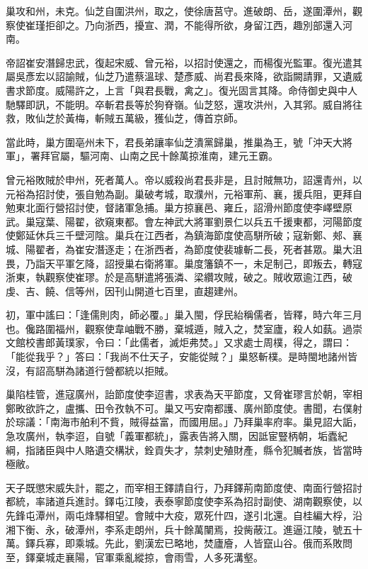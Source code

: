 \begin{pinyinscope}
 巢攻和州，未克。仙芝自圍洪州，取之，使徐唐莒守。進破朗、岳，遂圍潭州，觀察使崔瑾拒卻之。乃向浙西，擾宣、潤，不能得所欲，身留江西，趣別部還入河南。



 帝詔崔安潛歸忠武，復起宋威、曾元裕，以招討使還之，而楊復光監軍。復光遣其屬吳彥宏以詔諭賊，仙芝乃遣蔡溫球、楚彥威、尚君長來降，欲詣闕請罪，又遺威書求節度。威陽許之，上言「與君長戰，禽之」。復光固言其降。命侍御史與中人馳驛即訊，不能明。卒斬君長等於狗脊嶺。仙芝怒，還攻洪州，入其郛。威自將往救，敗仙芝於黃梅，斬賊五萬級，獲仙芝，傳首京師。



 當此時，巢方圍亳州未下，君長弟讓率仙芝潰黨歸巢，推巢為王，號「沖天大將軍」，署拜官屬，驅河南、山南之民十餘萬掠淮南，建元王霸。



 曾元裕敗賊於申州，死者萬人。帝以威殺尚君長非是，且討賊無功，詔還青州，以元裕為招討使，張自勉為副。巢破考城，取濮州，元裕軍荊、襄，援兵阻，更拜自勉東北面行營招討使，督諸軍急捕。巢方掠襄邑、雍丘，詔滑州節度使李嶧壁原武。巢寇葉、陽翟，欲窺東都。會左神武大將軍劉景仁以兵五千援東都，河陽節度使鄭延休兵三千壁河陰。巢兵在江西者，為鎮海節度使高駢所破；寇新鄭、郟、襄城、陽翟者，為崔安潛逐走；在浙西者，為節度使裴璩斬二長，死者甚眾。巢大沮畏，乃詣天平軍乞降，詔授巢右衛將軍。巢度籓鎮不一，未足制己，即叛去，轉寇浙東，執觀察使崔璆。於是高駢遣將張潾、梁纘攻賊，破之。賊收眾逾江西，破虔、吉、饒、信等州，因刊山開道七百里，直趨建州。



 初，軍中謠曰：「逢儒則肉，師必覆。」巢入閩，俘民紿稱儒者，皆釋，時六年三月也。儳路圍福州，觀察使韋岫戰不勝，棄城遁，賊入之，焚室廬，殺人如蓺。過崇文館校書郎黃璞家，令曰：「此儒者，滅炬弗焚。」又求處士周樸，得之，謂曰：「能從我乎？」答曰：「我尚不仕天子，安能從賊？」巢怒斬樸。是時閩地諸州皆沒，有詔高駢為諸道行營都統以拒賊。



 巢陷桂管，進寇廣州，詒節度使李迢書，求表為天平節度，又脅崔璆言於朝，宰相鄭畋欲許之，盧攜、田令孜執不可。巢又丐安南都護、廣州節度使。書聞，右僕射於琮議：「南海市舶利不貲，賊得益富，而國用屈。」乃拜巢率府率。巢見詔大詬，急攻廣州，執李迢，自號「義軍都統」，露表告將入關，因詆宦豎柄朝，垢蠹紀綱，指諸臣與中人賂遺交構狀，銓貢失才，禁刺史殖財產，縣令犯贓者族，皆當時極敝。



 天子既懲宋威失計，罷之，而宰相王鐸請自行，乃拜鐸荊南節度使、南面行營招討都統，率諸道兵進討。鐸屯江陵，表泰寧節度使李系為招討副使、湖南觀察使，以先鋒屯潭州，兩屯烽驛相望。會賊中大疫，眾死什四，遂引北還。自桂編大桴，沿湘下衡、永，破潭州，李系走朗州，兵十餘萬闉焉，投胔蔽江。進逼江陵，號五十萬。鐸兵寡，即乘城。先此，劉漢宏已略地，焚廬廥，人皆竄山谷。俄而系敗問至，鐸棄城走襄陽，官軍乘亂縱掠，會雨雪，人多死溝壑。




\end{pinyinscope}

